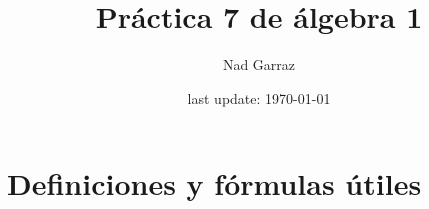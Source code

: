 

\usepackage{polynom} %





\pagestyle{empty} %

\title{Práctica 7 de álgebra 1} %
\author{Nad Garraz} %
\date{last update: \today} %

\maketitle  %

\newcommand{\polGen}[1]{\sumatoria{i=0}{n} #1_i X^i}

\section{Definiciones y fórmulas útiles}

